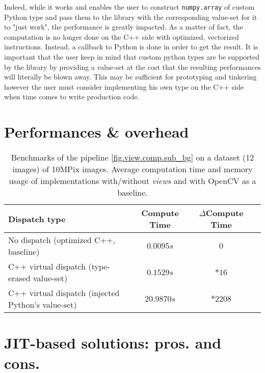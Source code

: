 Indeed, while it works and enables the user to construct \texttt{numpy.array} of custom Python type and pass them to the
library with the corresponding value-set for it to "just work", the performance is greatly impacted. As a matter of
fact, the computation is no longer done on the C++ side with optimized, vectorized instructions. Instead, a callback to
Python is done in order to get the result. It is important that the user keep in mind that custom python types are be
supported by the library by providing a value-set at the cost that the resulting performances will literally be blown
away. This may be sufficient for prototyping and tinkering however the user must consider implementing his own type on
the C++ side when time comes to write production code.

\section{Performances \& overhead}

\begin{table}[htbp]
  \begin{tabular}{l|ccc}
    \toprule
    Dispatch type                                      & Compute Time & $\Delta{}$Compute Time \\ \midrule
    No dispatch (optimized C++, baseline)              & $0.0095s$    & $0$                    \\
    C++ virtual dispatch (type-erased value-set)       & $0.1529s$    & $*16$                  \\
    C++ virtual dispatch (injected Python's value-set) & $20.9870s$   & $*2208$                \\
    \bottomrule
  \end{tabular}
  \caption{Benchmarks of the pipeline \cref{fig.view.comp.sub_bg} on a dataset (12 images) of 10MPix images. Average
    computation time and memory usage of implementations with/without \emph{views} and with OpenCV as a baseline.}
  \label{table:static.dynamic.perfs}
\end{table}

\section{JIT-based solutions: pros. and cons.}

